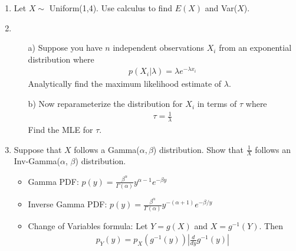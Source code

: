 \documentclass[10pt,a4paper]{article}
\begin{document}
\begin{enumerate}
\item Let $X \sim$ Uniform(1,4). Use calculus to find $E(X)$ and Var($X$).

\bigskip 

\item 
\begin{enumerate}
\item[a)]
Suppose you have $n$ independent observations $X_i$ from an exponential distribution where 
\begin{eqnarray*}
p(X_i | \lambda) = \lambda e^{-\lambda x_i}
\end{eqnarray*}
Analytically find the maximum likelihood estimate of $\lambda$.
\medskip
\item[b)] Now reparameterize the distribution for $X_i$ in terms of $\tau$ where 
\begin{eqnarray*}
\tau = \frac{1}{\lambda}
\end{eqnarray*}
Find the MLE for $\tau$.
\end{enumerate}

\bigskip

\item Suppose that $X$ follows a Gamma($\alpha, \beta$) distribution.  Show that $\frac{1}{X}$ follows an Inv-Gamma($\alpha$, $\beta$) distribution.

\begin{itemize}
\item Gamma PDF: $p(y) = \frac{\beta^{\alpha}}{\Gamma(\alpha)} y^{\alpha-1} e^{-\beta y}$
\item Inverse Gamma PDF: $p(y) = \frac{\beta^{\alpha}}{\Gamma(\alpha)} y^{-(\alpha+1)} e^{-\beta/y}$
\item Change of Variables formula: Let $Y = g(X)$ and $X = g^{-1}(Y)$.  Then 
\begin{eqnarray*}
p_Y(y) = p_X(g^{-1}(y)) \left \vert \frac{d}{dy} g^{-1}(y) \right \vert
\end{eqnarray*}
\end{itemize}

\bigskip


\end{enumerate}
\end{document}
